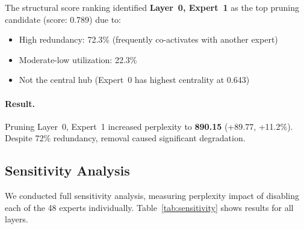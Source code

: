 \documentclass{article}
\begin{document}
The structural score ranking identified \textbf{Layer~0, Expert~1} as the top
pruning candidate (score: 0.789) due to:
\begin{itemize}
    \item High redundancy: 72.3\% (frequently co-activates with another expert)
    \item Moderate-low utilization: 22.3\%
    \item Not the central hub (Expert~0 has highest centrality at 0.643)
\end{itemize}

\paragraph{Result.}
Pruning Layer~0, Expert~1 increased perplexity to \textbf{890.15} (+89.77, +11.2\%).
Despite 72\% redundancy, removal caused significant degradation.

\subsection{Sensitivity Analysis}

We conducted full sensitivity analysis, measuring perplexity impact of disabling
each of the 48 experts individually.
Table~\ref{tab:sensitivity} shows results for all layers.
\end{document}
